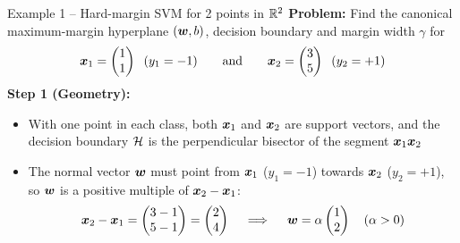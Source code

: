 \documentclass[aspectratio=169]{beamer}\usepackage[]{graphicx}\usepackage[]{xcolor}
\begin{document}
\begin{frame}{Example 1 -- Hard-margin SVM for 2 points in $\mathbb{R}^2$}
    \textbf{Problem:} Find the canonical maximum-margin hyperplane $(\bm{w}, b)$, decision boundary and margin width $\gamma$ for
    \[
        \bm{x}_1 = \begin{pmatrix} 1 \\ 1 \end{pmatrix} \;\; (y_1 = -1) \qquad \text{and} \qquad \bm{x}_2 = \begin{pmatrix} 3 \\ 5 \end{pmatrix} \;\; (y_2 = +1)
    \]
    \vfill
    \textbf{Step 1 (Geometry):}
    \begin{itemize}
        \item With one point in each class, both $\bm{x}_1$ and $\bm{x}_2$ are support vectors, and the decision boundary $\mathcal{H}$ is the perpendicular bisector of the segment $\bm{x}_1 \bm{x}_2$
        \item The normal vector $\bm{w}$ must point from $\bm{x}_1$ ($y_1 = -1$) towards $\bm{x}_2$ ($y_2 = +1$), so $\bm{w}$ is a positive multiple of $\bm{x}_2 - \bm{x}_1$:
        \[
            \bm{x}_2 - \bm{x}_1 = \begin{pmatrix} 3 - 1 \\ 5 - 1 \end{pmatrix} = \begin{pmatrix} 2 \\ 4 \end{pmatrix} \quad \implies \quad \bm{w} = \alpha \begin{pmatrix} 1 \\ 2 \end{pmatrix} \quad (\alpha > 0)
        \]
    \end{itemize}
\end{frame}
\end{document}
